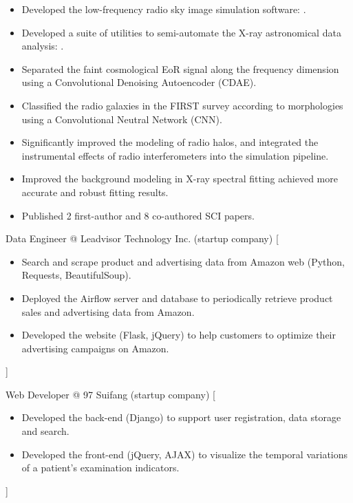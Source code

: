 \documentclass{resume}
\begin{document}
\begin{itemize}
  \item Developed the low-frequency radio sky image simulation software:
        .
  \item Developed a suite of utilities to semi-automate the
        X-ray astronomical data analysis:
        .
  \item Separated the faint cosmological EoR signal along the frequency
        dimension using a Convolutional Denoising Autoencoder (CDAE).
  \item Classified the radio galaxies in the FIRST survey according to
        morphologies using a Convolutional Neutral Network (CNN).
  \item Significantly improved the modeling of radio halos,
        and integrated the instrumental effects of radio interferometers
        into the simulation pipeline.
  \item Improved the background modeling in X-ray spectral fitting
        achieved more accurate and robust fitting results.
  \item Published 2 first-author and 8 co-authored SCI papers.
\end{itemize}

\begin{experiences}
  {Data Engineer @ Leadvisor Technology Inc. (startup company)}%
  [\begin{itemize}
      \item Search and scrape product and advertising data from Amazon web
            (Python, Requests, BeautifulSoup).
      \item Deployed the Airflow server and database to periodically
            retrieve product sales and advertising data from Amazon.
      \item Developed the website (Flask, jQuery) to help customers to
            optimize their advertising campaigns on Amazon.
    \end{itemize}]

  \separator{0.5ex}
  {Web Developer @ 97 Suifang (startup company)}%
  [\begin{itemize}
      \item Developed the back-end (Django) to support user registration,
            data storage and search.
      \item Developed the front-end (jQuery, AJAX) to visualize the
            temporal variations of a patient's examination indicators.
    \end{itemize}]
\end{experiences}
\end{document}
